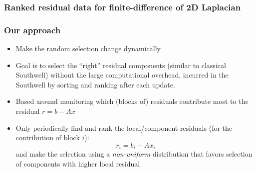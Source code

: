 \documentclass{beamer}
\begin{document}
\begin{frame}
	\frametitle{Ranked residual data for finite-difference of 2D Laplacian}
	\begin{figure}[H]
		\centering
	\end{figure}
\end{frame}


\begin{frame}
	\frametitle{Our approach}
	\begin{itemize}
		\item Make the random selection change dynamically 
		\item Goal is to  select the ``right'' residual components (similar to classical Southwell) without the large computational overhead, incurred in the Southwell  by sorting and ranking after each update.
		\item Based around monitoring which (blocks of) residuals contribute most to the residual $r = b - Ax$
		\item Only periodically find and rank the local/component residuals (for the contribution of block $i$):
			\begin{equation}
				r_i = b_i - Ax_i
			\end{equation}
			and make the selection using a {\it non-uniform} distribution that favors selection of components with higher local residual
	\end{itemize}
\end{frame}
\end{document}
